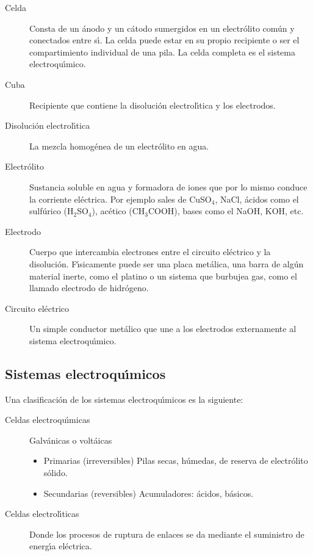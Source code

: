 \begin{description}
\item [Celda] Consta de un \'anodo y un c\'atodo 
sumergidos en un electr\'olito com\'un y conectados entre
s\'{\i}.  La celda puede estar en su propio recipiente o ser el compartimiento individual de
una pila. La celda completa es el sistema electroqu\'{\i}mico.
\item[Cuba]  Recipiente que contiene la disoluci\'on
electrol\'{\i}tica y los electrodos.
\item [Disoluci\'on electrol\'{\i}tica] La mezcla homog\'enea de un
electr\'olito en agua.
\item[Electr\'olito]  Sustancia soluble en agua y formadora de iones
que por lo mismo conduce la corriente el\'ectrica. Por ejemplo
sales de CuSO$_4$, NaCl, \'acidos como el sulf\'urico 
(H$_2$SO$_4$), ac\'etico (CH$_3$COOH), bases como el NaOH, KOH, etc.
\item[Electrodo] Cuerpo que intercambia electrones entre el
circuito el\'ectrico y la disoluci\'on. F\'{\i}sicamente puede ser
una placa met\'alica, una barra de alg\'un material inerte, como
el platino o un sistema que burbujea gas, como el llamado electrodo
 de hidr\'ogeno.
\item[Circuito el\'ectrico] Un simple conductor met\'alico que une
a los electrodos externamente al sistema electroqu\'{\i}mico.
\end{description}

\subsection{Sistemas electroqu\'{\i}micos}
Una clasificaci\'on de los sistemas electroqu\'{\i}micos es la siguiente:
\begin{description}
\item[Celdas electroqu\'{\i}micas]
Galv\'anicas o volt\'aicas
\begin{itemize}
 \item Primarias (irreversibles) 
  Pilas secas, h\'umedas, de reserva de e\-lec\-tr\'olito s\'olido.
\item Secundarias (reversibles)
  Acumuladores: \'acidos,
b\'asicos.
\end{itemize}

\item[Celdas electrol\'{\i}ticas] Donde los procesos de ruptura de enlaces se da mediante
el suministro de energ\'{\i}a el\'ectrica.
\end{description}

